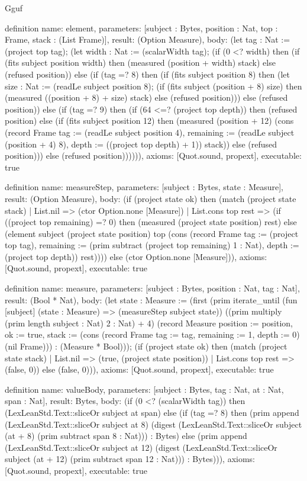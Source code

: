 \begin{lexlean}{Gguf}
\begin{semanticmodule}
definition{
  name: element,
  parameters: [subject : Bytes, position : Nat, top : Frame, stack : (List Frame)],
  result: (Option Measure),
  body: (let tag : Nat := (project top tag); (let width : Nat := (scalarWidth tag); (if (0 <? width) then (if (fits subject position width) then (measured (position + width) stack) else (refused position)) else (if (tag =? 8) then (if (fits subject position 8) then (let size : Nat := (readLe subject position 8); (if (fits subject (position + 8) size) then (measured ((position + 8) + size) stack) else (refused position))) else (refused position)) else (if (tag =? 9) then (if (64 <=? (project top depth)) then (refused position) else (if (fits subject position 12) then (measured (position + 12) (cons (record Frame {tag := (readLe subject position 4), remaining := (readLe subject (position + 4) 8), depth := ((project top depth) + 1)}) stack)) else (refused position))) else (refused position)))))),
  axioms: [Quot.sound, propext],
  executable: true
}

definition{
  name: measureStep,
  parameters: [subject : Bytes, state : Measure],
  result: (Option Measure),
  body: (if (project state ok) then (match (project state stack)
    | List.nil => (ctor Option.none [Measure])
    | List.cons top rest => (if ((project top remaining) =? 0) then (measured (project state position) rest) else (element subject (project state position) top (cons (record Frame {tag := (project top tag), remaining := (prim subtract (project top remaining) 1 : Nat), depth := (project top depth)}) rest)))) else (ctor Option.none [Measure])),
  axioms: [Quot.sound, propext],
  executable: true
}

definition{
  name: measure,
  parameters: [subject : Bytes, position : Nat, tag : Nat],
  result: (Bool * Nat),
  body: (let state : Measure := (first (prim iterate_until (fun [subject] (state : Measure) => (measureStep subject state)) ((prim multiply (prim length subject : Nat) 2 : Nat) + 4) (record Measure {position := position, ok := true, stack := (cons (record Frame {tag := tag, remaining := 1, depth := 0}) (nil Frame))}) : (Measure * Bool))); (if (project state ok) then (match (project state stack)
    | List.nil => (true, (project state position))
    | List.cons top rest => (false, 0)) else (false, 0))),
  axioms: [Quot.sound, propext],
  executable: true
}

definition{
  name: valueBody,
  parameters: [subject : Bytes, tag : Nat, at : Nat, span : Nat],
  result: Bytes,
  body: (if (0 <? (scalarWidth tag)) then (LexLeanStd.Text::sliceOr subject at span) else (if (tag =? 8) then (prim append (LexLeanStd.Text::sliceOr subject at 8) (digest (LexLeanStd.Text::sliceOr subject (at + 8) (prim subtract span 8 : Nat))) : Bytes) else (prim append (LexLeanStd.Text::sliceOr subject at 12) (digest (LexLeanStd.Text::sliceOr subject (at + 12) (prim subtract span 12 : Nat))) : Bytes))),
  axioms: [Quot.sound, propext],
  executable: true
}


\end{semanticmodule}
\end{lexlean}
